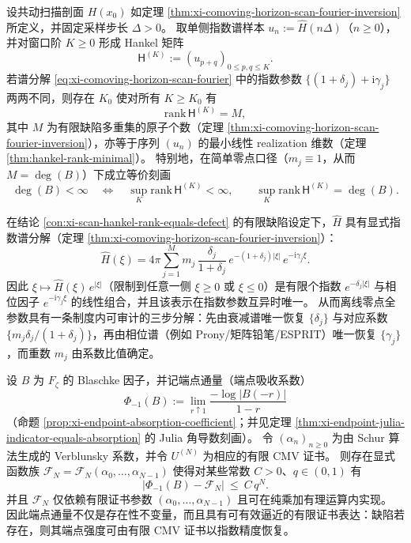 \begin{proposition}[扫描 Hankel 秩 \(=\) 缺陷度：层析样本与 Blaschke 指数的同一化]\label{con:xi-scan-hankel-rank-equals-defect}
设共动扫描剖面 \(H(x_0)\) 如定理 \ref{thm:xi-comoving-horizon-scan-fourier-inversion} 所定义，并固定采样步长 \(\Delta>0\)。
取单侧指数谱样本 \(u_n:=\widehat H(n\Delta)\)（\(n\ge 0\)），并对窗口阶 \(K\ge 0\) 形成 Hankel 矩阵
\[
\mathsf{H}^{(K)}:=(u_{p+q})_{0\le p,q\le K}.
\]
若谱分解 \eqref{eq:xi-comoving-horizon-scan-fourier} 中的指数参数 \(\{(1+\delta_j)+\mathrm{i}\gamma_j\}\) 两两不同，则存在 \(K_0\) 使对所有 \(K\ge K_0\) 有
\[
\mathrm{rank}\,\mathsf{H}^{(K)}=M,
\]
其中 \(M\) 为有限缺陷多重集的原子个数（定理 \ref{thm:xi-comoving-horizon-scan-fourier-inversion}），亦等于序列 \((u_n)\) 的最小线性 realization 维数（定理 \ref{thm:hankel-rank-minimal}）。
特别地，在简单零点口径（\(m_j\equiv 1\)，从而 \(M=\deg(B)\)）下成立等价刻画
\[
\deg(B)<\infty\quad\Longleftrightarrow\quad
\sup_{K}\mathrm{rank}\,\mathsf{H}^{(K)}<\infty,
\qquad
\sup_{K}\mathrm{rank}\,\mathsf{H}^{(K)}=\deg(B).
\]
\end{proposition}

\begin{proposition}\label{con:xi-scan-exponential-spectrum-separation}
在结论 \ref{con:xi-scan-hankel-rank-equals-defect} 的有限缺陷设定下，\(\widehat H\) 具有显式指数谱分解（定理 \ref{thm:xi-comoving-horizon-scan-fourier-inversion}）：
\[
\widehat H(\xi)
=4\pi\sum_{j=1}^{M} m_j\,\frac{\delta_j}{1+\delta_j}\,
e^{-(1+\delta_j)|\xi|}\,e^{-\mathrm{i}\gamma_j\xi}.
\]
因此 \( \xi\mapsto \widehat H(\xi)\,e^{|\xi|}\)（限制到任意一侧 \(\xi\ge 0\) 或 \(\xi\le 0\)）是有限个指数 \(e^{-\delta_j|\xi|}\) 与相位因子 \(e^{-\mathrm{i}\gamma_j\xi}\) 的线性组合，并且该表示在指数参数互异时唯一。
从而离线零点全参数具有一条制度内可审计的三步分解：先由衰减谱唯一恢复 \(\{\delta_j\}\) 与对应系数 \(\{m_j\delta_j/(1+\delta_j)\}\)，再由相位谱（例如 Prony/矩阵铅笔/ESPRIT）唯一恢复 \(\{\gamma_j\}\)，而重数 \(m_j\) 由系数比值确定。
\end{proposition}

\begin{proposition}\label{con:xi-endpoint-flux-computable-by-finite-cmv}
设 \(B\) 为 \(F_{\zeta}\) 的 Blaschke 因子，并记端点通量（端点吸收系数）
\[
\Phi_{-1}(B):=\lim_{r\uparrow 1}\frac{-\log|B(-r)|}{1-r}
\]
（命题 \ref{prop:xi-endpoint-absorption-coefficient}；并见定理 \ref{thm:xi-endpoint-julia-indicator-equals-absorption} 的 Julia 角导数刻画）。
令 \((\alpha_n)_{n\ge 0}\) 为由 Schur 算法生成的 Verblunsky 系数，并令 \(U^{(N)}\) 为相应的有限 CMV 证书。
则存在显式函数族 \(\mathcal{F}_N=\mathcal{F}_N(\alpha_0,\dots,\alpha_{N-1})\) 使得对某些常数 \(C>0\)、\(q\in(0,1)\) 有
\[
\bigl|\Phi_{-1}(B)-\mathcal{F}_N\bigr|\ \le\ C\,q^N.
\]
并且 \(\mathcal{F}_N\) 仅依赖有限证书参数 \((\alpha_0,\dots,\alpha_{N-1})\) 且可在纯乘加有理运算内实现。
因此端点通量不仅是存在性不变量，而且具有可有效逼近的有限证书表达：缺陷若存在，则其端点强度可由有限 CMV 证书以指数精度恢复。
\end{proposition}

